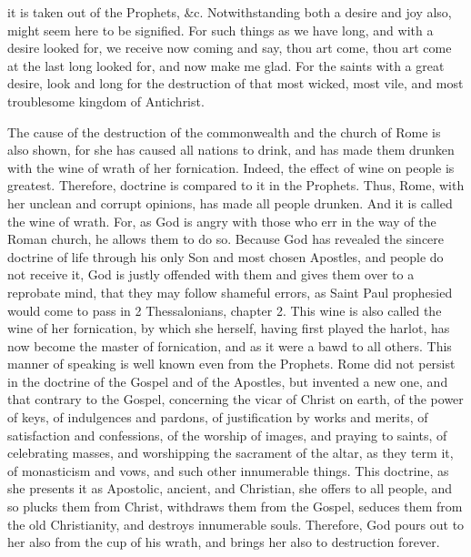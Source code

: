 it is taken out of the Prophets, \&c. Notwithstanding both a desire and joy also, might seem here to be signified. For such things as we have long, and with a desire looked for, we receive now coming and say, thou art come, thou art come at the last long looked for, and now make me glad. For the saints with a great desire, look and long for the destruction of that most wicked, most vile, and most troublesome kingdom of Antichrist.

The cause of the destruction of the commonwealth and the church of Rome is also shown, for she has caused all nations to drink, and has made them drunken with the wine of wrath of her fornication. Indeed, the effect of wine on people is greatest. Therefore, doctrine is compared to it in the Prophets. Thus, Rome, with her unclean and corrupt opinions, has made all people drunken. And it is called the wine of wrath. For, as God is angry with those who err in the way of the Roman church, he allows them to do so. Because God has revealed the sincere doctrine of life through his only Son and most chosen Apostles, and people do not receive it, God is justly offended with them and gives them over to a reprobate mind, that they may follow shameful errors, as Saint Paul prophesied would come to pass in 2 Thessalonians, chapter 2. This wine is also called the wine of her fornication, by which she herself, having first played the harlot, has now become the master of fornication, and as it were a bawd to all others. This manner of speaking is well known even from the Prophets. Rome did not persist in the doctrine of the Gospel and of the Apostles, but invented a new one, and that contrary to the Gospel, concerning the vicar of Christ on earth, of the power of keys, of indulgences and pardons, of justification by works and merits, of satisfaction and confessions, of the worship of images, and praying to saints, of celebrating masses, and worshipping the sacrament of the altar, as they term it, of monasticism and vows, and such other innumerable things. This doctrine, as she presents it as Apostolic, ancient, and Christian, she offers to all people, and so plucks them from Christ, withdraws them from the Gospel, seduces them from the old Christianity, and destroys innumerable souls. Therefore, God pours out to her also from the cup of his wrath, and brings her also to destruction forever.

